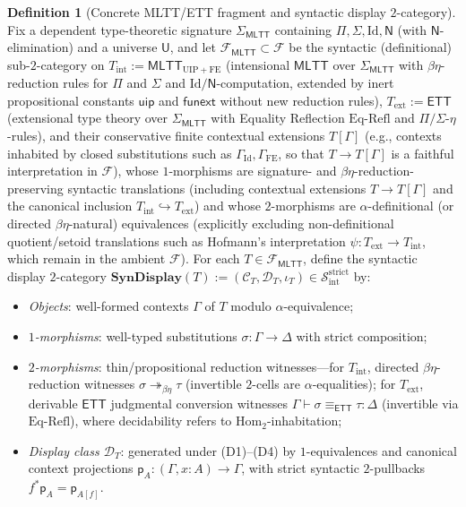 \documentclass[11pt]{article}
\theoremstyle{plain}
\theoremstyle{definition}
\newtheorem{definition}[theorem]{Definition}
\newcommand{\cF}{\mathcal{F}}
\newcommand{\cC}{\mathcal{C}}
\newcommand{\cD}{\mathcal{D}}
\newcommand{\Hom}{\mathrm{Hom}}
\newcommand{\MLTT}{\mathsf{MLTT}}
\newcommand{\ETT}{\mathsf{ETT}}
\begin{document}
\begin{definition}[Concrete MLTT/ETT fragment and syntactic display $2$-category]\label{def:I-fragment}
Fix a dependent type-theoretic signature $\Sigma_{\MLTT}$ containing $\Pi, \Sigma, \mathrm{Id}, \mathsf{N}$ (with $\mathsf{N}$-elimination) and a universe $\mathsf{U}$, and let $\mathcal{F}_{\MLTT} \subset \cF$ be the syntactic (definitional) sub-$2$-category on $T_{\mathrm{int}} := \MLTT_{\mathrm{UIP}+\mathrm{FE}}$ (intensional $\MLTT$ over $\Sigma_{\MLTT}$ with $\beta\eta$-reduction rules for $\Pi$ and $\Sigma$ and $\mathrm{Id}/\mathsf{N}$-computation, extended by inert propositional constants $\mathsf{uip}$ and $\mathsf{funext}$ without new reduction rules), $T_{\mathrm{ext}} := \ETT$ (extensional type theory over $\Sigma_{\MLTT}$ with Equality Reflection $\text{Eq-Refl}$ and $\Pi/\Sigma$-$\eta$-rules), and their conservative finite contextual extensions $T[\Gamma]$ (e.g., contexts inhabited by closed substitutions such as $\Gamma_{\mathrm{Id}}, \Gamma_{\mathrm{FE}}$, so that $T \to T[\Gamma]$ is a faithful interpretation in $\cF$), whose $1$-morphisms are signature- and $\beta\eta$-reduction-preserving syntactic translations (including contextual extensions $T \to T[\Gamma]$ and the canonical inclusion $T_{\mathrm{int}} \hookrightarrow T_{\mathrm{ext}}$) and whose $2$-morphisms are $\alpha$-definitional (or directed $\beta\eta$-natural) equivalences (explicitly excluding non-definitional quotient/setoid translations such as Hofmann's interpretation $\psi : T_{\mathrm{ext}} \to T_{\mathrm{int}}$, which remain in the ambient $\cF$). For each $T \in \mathcal{F}_{\MLTT}$, define the syntactic display $2$-category $\mathbf{SynDisplay}(T) := (\cC_T, \cD_T, \iota_T) \in \mathcal{S}_{\mathrm{int}}^{\mathrm{strict}}$ by:
\begin{itemize}[nosep]
\item \emph{Objects}: well-formed contexts $\Gamma$ of $T$ modulo $\alpha$-equivalence;
\item \emph{$1$-morphisms}: well-typed substitutions $\sigma : \Gamma \to \Delta$ with strict composition;
\item \emph{$2$-morphisms}: thin/propositional reduction witnesses---for $T_{\mathrm{int}}$, directed $\beta\eta$-reduction witnesses $\sigma \twoheadrightarrow_{\beta\eta} \tau$ (invertible $2$-cells are $\alpha$-equalities); for $T_{\mathrm{ext}}$, derivable $\ETT$ judgmental conversion witnesses $\Gamma \vdash \sigma \equiv_{\ETT} \tau : \Delta$ (invertible via $\text{Eq-Refl}$), where decidability refers to $\Hom_2$-inhabitation;
\item \emph{Display class $\cD_T$}: generated under (D1)--(D4) by $1$-equivalences and canonical context projections $\mathsf{p}_A : (\Gamma, x : A) \to \Gamma$, with strict syntactic $2$-pullbacks $f^*\mathsf{p}_A = \mathsf{p}_{A[f]}$.
\end{itemize}
\end{definition}
\end{document}
